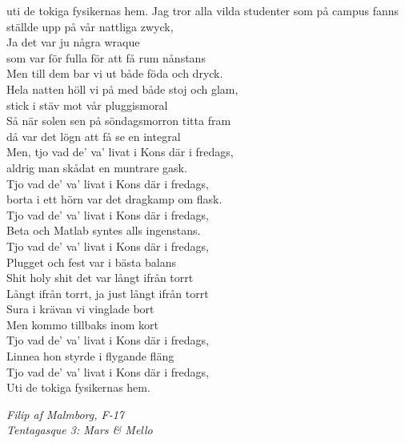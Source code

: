 \documentclass[a6paper,10pt]{article}
\begin{document}
uti de tokiga fysikernas hem.
\newpage
\setlength{\oddsidemargin}{-0.37in}
\noindent
Jag tror alla vilda studenter som på campus fanns\\
ställde upp på vår nattliga zwyck,\\
Ja det var ju några wraque\\
som var för fulla för att få rum nånstans\\
Men till dem bar vi ut både föda och dryck.\\
Hela natten höll vi på med både stoj och glam,\\
stick i stäv mot vår pluggismoral\\
Så när solen sen på söndagsmorron titta fram\\
då var det lögn att få se en integral
\vspace{5pt}\\
Men, tjo vad de’ va’ livat i Kons där i fredags,\\
aldrig man skådat en muntrare gask.\\
Tjo vad de’ va’ livat i Kons där i fredags,\\
borta i ett hörn var det dragkamp om flask.\\
Tjo vad de’ va’ livat i Kons där i fredags,\\
Beta och Matlab syntes alls ingenstans.\\
Tjo vad de’ va’ livat i Kons där i fredags,\\
Plugget och fest var i bästa balans
\vspace{5pt}\\
Shit holy shit det var långt ifrån torrt\\
Långt ifrån torrt, ja just långt ifrån torrt\\
Sura i krävan vi vinglade bort\\
Men kommo tillbaks inom kort
\vspace{5pt}\\
Tjo vad de’ va’ livat i Kons där i fredags,\\
Linnea hon styrde i flygande fläng\\
Tjo vad de’ va’ livat i Kons där i fredags,\\
Uti de tokiga fysikernas hem.

\begin{flushright}
\textit{Filip af Malmborg, F-17 \\ Tentagasque 3: Mars \& Mello}
\end{flushright}

\setlength{\oddsidemargin}{-0.47in}
\end{document}
